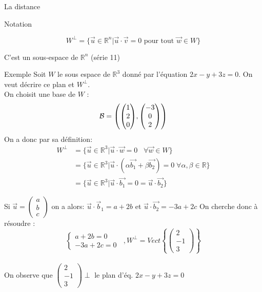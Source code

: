 \begin{parag}{La distance}
\begin{subparag}{Notation}
            \begin{formule}
                \[W^\perp = \{\vec{u} \in \mathbb{R}^n| \vec{u} \cdot \vec{v} = 0 \text{ pour tout } \vec{w} \in W\}\]
            \end{formule}
            C'est un sous-espace de $\mathbb{R}^n$ (série 11)
        \end{subparag}
        \begin{subparag}{Exemple}
            Soit $W$ le sous espace de $\mathbb{R}^3$ donné par l'équation $2x -y + 3z = 0$. On veut décrire ce plan et $W^\perp$.
            \\
            On choisit une base de $W$ : 
            \[\bmath = \left(\begin{pmatrix}
                1 \\ 2 \\ 0
            \end{pmatrix}, \begin{pmatrix}
                -3 \\ 0 \\ 2
            \end{pmatrix}\right)\]
            On a donc par sa définition:
            \begin{align*}
              W^\perp &= \{\vec{u} \in \mathbb{R}^3|  \vec
            u\cdot \vec{w} = 0 \;\;\;\forall \vec{w} \in W\}\\  
            &= \{\vec{u} \in \mathbb{R}^3|\vec{u}\cdot(\alpha\vec{b_1} + \beta\vec{b_2}) = 0 \; \forall\alpha, \beta \in \mathbb{R}\}\\
            &= \{\vec{u} \in \mathbb{R}^3| \vec{u}\cdot\vec{b_1} = 0 = \vec{u}\cdot\vec{b_2}\}
            \end{align*}

            
            Si $\vec{u} = \begin{pmatrix}
                a \\ b \\ c
            \end{pmatrix}$ on a alors: 
            $\vec{u} \cdot \vec{b}_1 = a + 2b$ et $\vec{u}\cdot \vec{b_2} = -3a + 2c$
            On cherche donc à résoudre : 
            \[\begin{cases}
                a + 2b = 0\\
                -3a + 2c = 0
            \end{cases}\; \; , W^\perp = Vect\left\{\begin{pmatrix}
                2 \\ -1 \\ 3
            \end{pmatrix}\right\}\]
            \\
            On observe que $\begin{pmatrix}
                2 \\ -1 \\ 3 
            \end{pmatrix}\perp$ le plan d'éq. $2x -y + 3z = 0$
        \end{subparag}

\end{parag}

